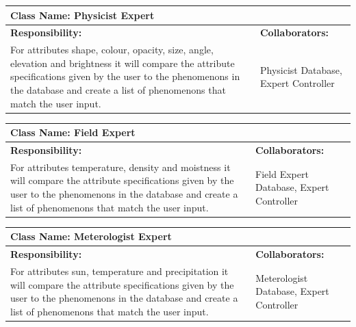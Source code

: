 \documentclass[]{article}
\begin{document}
	\begin{table}[ht]
		\centering
		\begin{tabular}{|p{5cm}|p{5cm}|}
		\hline 
		 \multicolumn{2}{|l|}{\textbf{Class Name: Physicist Expert}} \\
		\hline
		\textbf{Responsibility:} & \textbf{Collaborators:} \\
		\hline
		For attributes shape, colour, opacity, size, angle, elevation and brightness it will compare the attribute specifications given by the user to the phenomenons in the database and create a list of phenomenons that match the user input.  \vspace{1in} & Physicist Database, Expert Controller \\
		\hline
		\end{tabular}
	\end{table}
	
	\begin{table}[ht]
		\centering
		\begin{tabular}{|p{5cm}|p{5cm}|}
		\hline 
		 \multicolumn{2}{|l|}{\textbf{Class Name: Field Expert}} \\
		\hline
		\textbf{Responsibility:} & \textbf{Collaborators:} \\
		\hline
		For attributes temperature, density and moistness it will compare the attribute specifications given by the user to the phenomenons in the database and create a list of phenomenons that match the user input. \vspace{1in} & Field Expert Database, Expert Controller\\
		\hline
		\end{tabular}
	\end{table}
	
	\begin{table}[ht]
		\centering
		\begin{tabular}{|p{5cm}|p{5cm}|}
		\hline 
		 \multicolumn{2}{|l|}{\textbf{Class Name: Meterologist Expert}} \\
		\hline
		\textbf{Responsibility:} & \textbf{Collaborators:} \\
		\hline
		For attributes sun, temperature and precipitation it will compare the attribute specifications given by the user to the phenomenons in the database and create a list of phenomenons that match the user input.\vspace{1in} & Meterologist Database, Expert Controller\\
		\hline
		\end{tabular}
	\end{table}
\end{document}
